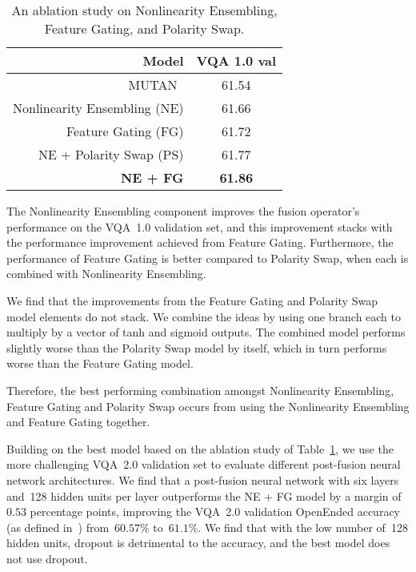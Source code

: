 \begin{table}[!t]
\centering
\caption{An ablation study on Nonlinearity Ensembling, Feature Gating, and
         Polarity Swap.}
\begin{tabular}{rc}
\textbf{Model} & \textbf{VQA 1.0 val} \\
\midrule
MUTAN~\cite{ben2017mutan} & 61.54 \\
\midrule
Nonlinearity Ensembling (NE) & 61.66 \\
Feature Gating (FG) & 61.72 \\
NE + Polarity Swap (PS) & 61.77 \\
\textbf{NE + FG} & \textbf{61.86} \\
\end{tabular}
\label{tab:model-ablation}
\end{table}

The Nonlinearity Ensembling component improves the fusion operator's
performance on the VQA~1.0 validation set, and this improvement stacks with
the performance improvement achieved from Feature Gating. Furthermore, the
performance of Feature Gating is better compared to Polarity Swap, when each
is combined with Nonlinearity Ensembling.

We find that the improvements from the Feature Gating and Polarity Swap model
elements do not stack. We combine the ideas by using one branch each to
multiply by a vector of tanh and sigmoid outputs. The combined model performs
slightly worse than the Polarity Swap model by itself, which in turn performs
worse than the Feature Gating model.

Therefore, the best performing combination amongst Nonlinearity Ensembling,
Feature Gating and Polarity Swap occurs from using the Nonlinearity Ensembling
and Feature Gating together.

Building on the best model based on the ablation study of
Table~\ref{tab:model-ablation}, we use the more challenging VQA~2.0 validation
set to evaluate different post-fusion neural network architectures. We find
that a post-fusion neural network with six layers and~\num{128} hidden units
per layer outperforms the NE + FG model by a margin of~$0.53$ percentage
points, improving the VQA~2.0 validation OpenEnded accuracy (as defined
in~\cite{goyal2017making}) from~$60.57\%$ to~$61.1\%$. We find that with the
low number of~\num{128} hidden units, dropout is detrimental to the accuracy,
and the best model does not use dropout.

